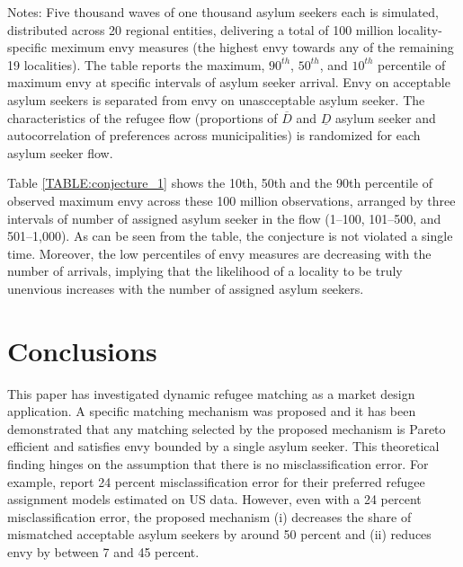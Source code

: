 \documentclass[12pt,fleqn]{article}
\begin{document}
\begin{table}[h]
\caption{Simulation results for the conjecture that envy is bounded by one in acceptable and unacceptable asylum seekers.}
\label{TABLE:conjecture_1}
{\scriptsize \vspace{0.1em}
	\begin{singlespace}
		{\sc Notes:} Five thousand waves of one thousand asylum seekers each is simulated, distributed across 20 regional entities, delivering a total of 100 million locality-specific meximum envy measures (the highest envy towards any of the remaining 19 localities). The table reports the maximum, $90^{th}$, $50^{th}$, and $10^{th}$ percentile of maximum envy at specific intervals of asylum seeker arrival. Envy on acceptable asylum seekers is separated from envy on unascceptable asylum seeker. The characteristics of the refugee flow (proportions of $\overline{D}$ and $\underline{D}$ asylum seeker and autocorrelation of preferences across municipalities) is randomized for each asylum seeker flow. 
	\end{singlespace}
	 }
	\end{table}

Table \ref{TABLE:conjecture_1} shows the 10th, 50th and the 90th percentile of observed maximum envy across these 100 million observations, arranged by three intervals of number of assigned asylum seeker in the flow (1--100, 101--500, and 501--1,000). As can be seen from the table, the conjecture is not violated a single time. Moreover, the low percentiles of envy measures are decreasing with the number of arrivals, implying that the likelihood of a locality to be truly unenvious increases with the number of assigned asylum seekers.


\section{Conclusions}\label{SEC:conclusions}
This paper has investigated dynamic refugee matching as a market design application. A specific matching mechanism was proposed and it has been demonstrated that any matching selected by the proposed mechanism is Pareto efficient and satisfies envy bounded by a single asylum seeker. This theoretical finding hinges on the assumption that there is no misclassification error. For example, \cite{bib:BansakEtAl} report 24 percent misclassification error for their preferred refugee assignment models estimated on US data. However, even with a 24 percent misclassification error, the proposed mechanism (i) decreases the share of mismatched acceptable asylum seekers by around 50 percent and (ii) reduces envy by between 7 and 45 percent.
\end{document}
